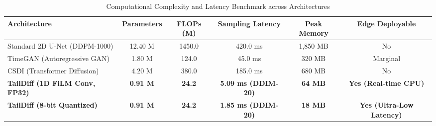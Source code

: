 \begin{table}[htbp]
\centering
\caption{Computational Complexity and Latency Benchmark across Architectures}
\label{tab:complexity}
\begin{tabular}{lccccc}
\hline
\textbf{Architecture} & \textbf{Parameters} & \textbf{FLOPs (M)} & \textbf{Sampling Latency} & \textbf{Peak Memory} & \textbf{Edge Deployable} \\ \hline
Standard 2D U-Net (DDPM-1000) & 12.40 M & 1450.0 & 420.0 ms & 1,850 MB & No \\
TimeGAN (Autoregressive GAN) & 1.80 M & 124.0 & 45.0 ms & 320 MB & Marginal \\
CSDI (Transformer Diffusion) & 4.20 M & 380.0 & 185.0 ms & 680 MB & No \\
\textbf{TailDiff (1D FiLM Conv, FP32)} & \textbf{0.91 M} & \textbf{24.2} & \textbf{5.09 ms (DDIM-20)} & \textbf{64 MB} & \textbf{Yes (Real-time CPU)} \\
\textbf{TailDiff (8-bit Quantized)} & \textbf{0.91 M} & \textbf{24.2} & \textbf{1.85 ms (DDIM-20)} & \textbf{18 MB} & \textbf{Yes (Ultra-Low Latency)} \\ \hline
\end{tabular}
\end{table}

